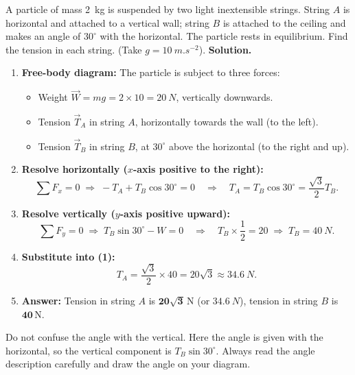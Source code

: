 \documentclass[11pt]{article}
\newcommand{\legende}[1]{\par\vspace{6pt}{\popsemi\fontsize{9}{11.5}\selectfont\color{popmuted}#1}}
\begin{document}
\begin{exoresolu}
A particle of mass \SI{2}{kg} is suspended by two light inextensible strings. String $A$ is horizontal and attached to a vertical wall; string $B$ is attached to the ceiling and makes an angle of $30^\circ$ with the horizontal. The particle rests in equilibrium. Find the tension in each string. (Take $g = \SI{10}{m.s^{-2}}$).
\tcblower
\textbf{Solution.}
\begin{enumerate}
    \item \textbf{Free-body diagram:} The particle is subject to three forces:
    \begin{itemize}
        \item Weight $\vec{W} = mg = 2 \times 10 = \SI{20}{N}$, vertically downwards.
        \item Tension $\vec{T}_A$ in string $A$, horizontally towards the wall (to the left).
        \item Tension $\vec{T}_B$ in string $B$, at $30^\circ$ above the horizontal (to the right and up).
    \end{itemize}
    \begin{popfigure}
    \legende{Free-body diagram of the particle}
    \end{popfigure}
    \item \textbf{Resolve horizontally ($x$-axis positive to the right):}
    \[
    \sum F_x = 0 \;\Longrightarrow\; -T_A + T_B\cos 30^\circ = 0 \quad\Rightarrow\quad T_A = T_B\cos 30^\circ = \frac{\sqrt{3}}{2}T_B. \tag{1}
    \]
    \item \textbf{Resolve vertically ($y$-axis positive upward):}
    \[
    \sum F_y = 0 \;\Longrightarrow\; T_B\sin 30^\circ - W = 0 \quad\Rightarrow\quad T_B \times \frac{1}{2} = 20 \;\Longrightarrow\; T_B = \SI{40}{N}.
    \]
    \item \textbf{Substitute into (1):}
    \[
    T_A = \frac{\sqrt{3}}{2} \times 40 = 20\sqrt{3} \approx \SI{34.6}{N}.
    \]
    \item \textbf{Answer:} Tension in string $A$ is $\boldsymbol{20\sqrt{3}\,\mathrm{N}}$ (or $\SI{34.6}{N}$), tension in string $B$ is $\boldsymbol{40\,\mathrm{N}}$.
\end{enumerate}
\begin{attention}
Do not confuse the angle with the vertical. Here the angle is given with the horizontal, so the vertical component is $T_B\sin 30^\circ$. Always read the angle description carefully and draw the angle on your diagram.
\end{attention}
\end{exoresolu}
\end{document}
